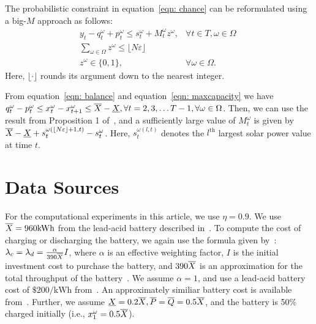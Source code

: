 The probabilistic constraint in equation~\eqref{eqn: chance} can be reformulated using a big-$M$ approach as follows:
\begin{subequations} \label{eqn:BigM}
\begin{eqnarray} 
\label{eqn:BigM_1} &  y_t - q_t^\omega +  p_t^\omega \le s_t^\omega + M_t^\omega z^\omega , & \forall t \in T, \omega \in \Omega \;\; \;\;  \\
\label{eqn:BigM_2} & \sum_{\omega \in \Omega} z^\omega \le \lfloor 
N \varepsilon \rfloor \\
& \label{eqn:BigM_3} z^\omega \in \{0,1\}, & \forall  \omega \in \Omega.
\end{eqnarray}
\end{subequations}
Here, $\lfloor \cdot \rfloor$ rounds its argument down to the nearest integer.
\begin{proposition} 

 From equation~\eqref{eqn: balance} and equation~\eqref{eqn: maxcapacity} we have  $ q_t^\omega - p_t^\omega \le  x_t^\omega - x_{t+1}^\omega \le {\overline{X}} - {\underline{X}},  \forall t = 2, 3, \ldots T-1, \forall \omega \in \Omega$. Then, we can use the result from Proposition 1 of~\cite{singh}, and a sufficiently large value of $M_t^\omega$ is given by ${\overline{X}} - {\underline{X}} + s_t^{\omega(\lfloor N \varepsilon \rfloor + 1,t)} - s_t^\omega$. Here, $s_t^{\omega(l,t)}$ denotes the $l^\text{th}$ largest solar power value at time $t$.
\end{proposition}


\section{Data Sources} \label{sec:data}

For the computational experiments in this article, we use $\eta = 0.9$. We use ${\overline{X}}=960 \text{kWh}$ from the lead-acid battery described in~\cite{zhao2013operation}. To compute the cost of charging or discharging the battery, we again use the formula given by~\cite{zhao2013operation}: $ \lambda_c= \lambda_d = \frac{\alpha}{390 {\overline{X}}} I$, where $\alpha$ is an effective weighting factor, $I$ is the initial investment cost to purchase the battery, and $390 {\overline{X}}$ is an approximation for the total throughput of the battery~\cite{jenkins2008lifetime}. We assume $\alpha =1$, and use a lead-acid battery cost of $\$ 200/\text{kWh}$ from~\cite{nameplate}. An approximately similiar  battery cost is available from~\cite{nameplate2}. Further, we assume ${\underline{X}}= 0.2 {\overline{X}}, {\overline{P}}={\overline{Q}}= 0.5 {\overline{X}}$, and the battery is 50\% charged initially (i.e., $x_1^\omega = 0.5 {\overline{X}}$). 


